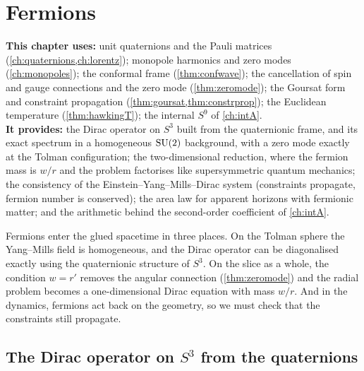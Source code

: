 \chapter{Fermions}
\label{ch:fermions}

\begin{usesbox}
\textbf{This chapter uses:} unit quaternions and the Pauli matrices (\cref{ch:quaternions,ch:lorentz}); monopole harmonics and zero modes (\cref{ch:monopoles}); the conformal frame (\cref{thm:confwave}); the cancellation of spin and gauge connections and the zero mode (\cref{thm:zeromode}); the Goursat form and constraint propagation (\cref{thm:goursat,thm:constrprop}); the Euclidean temperature (\cref{thm:hawkingT}); the internal $S^9$ of \cref{ch:intA}.\\
\textbf{It provides:} the Dirac operator on $S^3$ built from the quaternionic frame, and its exact spectrum in a homogeneous $\mathrm{SU}(2)$ background, with a zero mode exactly at the Tolman configuration; the two-dimensional reduction, where the fermion mass is $w/r$ and the problem factorises like supersymmetric quantum mechanics; the consistency of the Einstein--Yang--Mills--Dirac system (constraints propagate, fermion number is conserved); the area law for apparent horizons with fermionic matter; and the arithmetic behind the second-order coefficient of \cref{ch:intA}.
\end{usesbox}

Fermions enter the glued spacetime in three places. On the Tolman sphere the Yang--Mills field is homogeneous, and the Dirac operator can be diagonalised exactly using the quaternionic structure of $S^3$. On the slice as a whole, the condition $w=r'$ removes the angular connection (\cref{thm:zeromode}) and the radial problem becomes a one-dimensional Dirac equation with mass $w/r$. And in the dynamics, fermions act back on the geometry, so we must check that the constraints still propagate.

\section{The Dirac operator on \texorpdfstring{$S^3$}{S3} from the quaternions}

